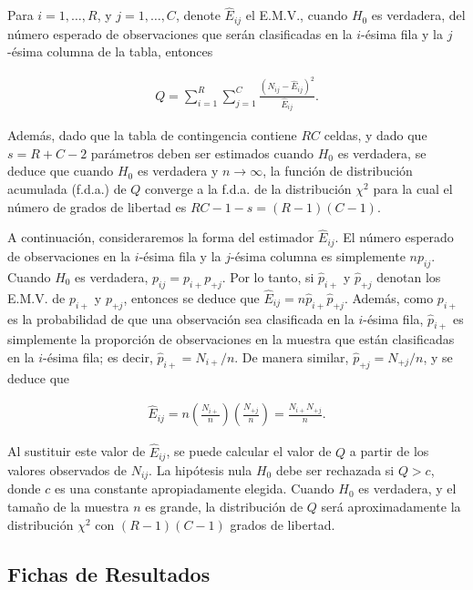 \documentclass{book}
\begin{document}
Para $i = 1, \ldots, R$, y $j = 1, \ldots, C$, denote $\hat{E}_{ij}$ el E.M.V., cuando $H_0$ es verdadera, del número esperado de observaciones que serán clasificadas en la $i$-ésima fila y la $j$-ésima columna de la tabla, entonces

\begin{align}
Q = \sum_{i=1}^{R} \sum_{j=1}^{C} \frac{(N_{ij} - \hat{E}_{ij})^2}{\hat{E}_{ij}}.
\end{align}

Además, dado que la tabla de contingencia contiene $RC$ celdas, y dado que $s = R + C - 2$ parámetros deben ser estimados cuando $H_0$ es verdadera, se deduce que cuando $H_0$ es verdadera y $n \to \infty$, la función de distribución acumulada (f.d.a.) de $Q$ converge a la f.d.a. de la distribución $\chi^2$ para la cual el número de grados de libertad es $RC - 1 - s = (R - 1)(C - 1)$.

A continuación, consideraremos la forma del estimador $\hat{E}_{ij}$. El número esperado de observaciones en la $i$-ésima fila y la $j$-ésima columna es simplemente $np_{ij}$. Cuando $H_0$ es verdadera, $p_{ij} = p_{i+}p_{+j}$. Por lo tanto, si $\hat{p}_{i+}$ y $\hat{p}_{+j}$ denotan los E.M.V. de $p_{i+}$ y $p_{+j}$, entonces se deduce que $\hat{E}_{ij} = n\hat{p}_{i+}\hat{p}_{+j}$. Además, como $p_{i+}$ es la probabilidad de que una observación sea clasificada en la $i$-ésima fila, $\hat{p}_{i+}$ es simplemente la proporción de observaciones en la muestra que están clasificadas en la $i$-ésima fila; es decir, $\hat{p}_{i+} = N_{i+}/n$. De manera similar, $\hat{p}_{+j} = N_{+j}/n$, y se deduce que

\begin{align}
\hat{E}_{ij} = n\left(\frac{N_{i+}}{n}\right)\left(\frac{N_{+j}}{n}\right) = \frac{N_{i+}N_{+j}}{n}.
\end{align}

Al sustituir este valor de $\hat{E}_{ij}$, se puede calcular el valor de $Q$ a partir de los valores observados de $N_{ij}$. La hipótesis nula $H_0$ debe ser rechazada si $Q > c$, donde $c$ es una constante apropiadamente elegida. Cuando $H_0$ es verdadera, y el tamaño de la muestra $n$ es grande, la distribución de $Q$ será aproximadamente la distribución $\chi^2$ con $(R - 1)(C - 1)$ grados de libertad.

\subsection{Fichas de Resultados}




\nocite{*}
\end{document}
